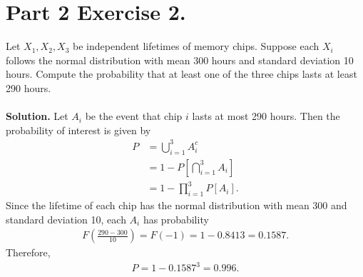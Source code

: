\section*{Part 2 Exercise 2.}

Let $X_1, X_2, X_3$ be independent lifetimes of memory chips. Suppose each $X_i$ follows the normal distribution with mean 300 hours and standard deviation 10 hours. Compute the probability that at least one of the three chips lasts at least 290 hours. \\
~\\
\textbf{Solution.} Let $A_i$ be the event that chip $i$ lasts at most 290 hours. Then the probability of interest is given by
\begin{align*}
P & = \bigcup_{i=1}^3 A_i^c \\
& = 1 - P\left[\bigcap_{i=1}^3 A_i \right] \\
& = 1 - \prod_{i=1}^3 P[A_i].
\end{align*}
Since the lifetime of each chip has the normal distribution with mean 300 and standard deviation 10, each $A_i$ has probability
\begin{align*}
F\left(\frac{290 - 300}{10} \right) = F(-1) = 1 - 0.8413 = 0.1587.
\end{align*}
Therefore,
\begin{align*}
P = 1 - 0.1587^3 = 0.996.
\end{align*}
